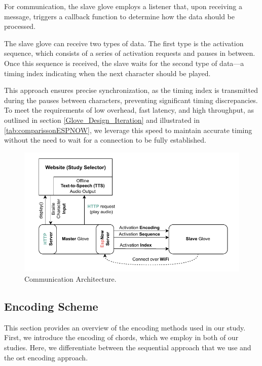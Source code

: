 For communication, the slave glove employs a listener that, upon receiving a message, triggers a callback function to determine how the data should be processed.

The slave glove can receive two types of data. The first type is the activation sequence, which consists of a series of activation requests and pauses in between. Once this sequence is received, the slave waits for the second type of data—a timing index indicating when the next character should be played.

This approach ensures precise synchronization, as the timing index is transmitted during the pauses between characters, preventing significant timing discrepancies. To meet the requirements of low overhead, fast latency, and high throughput, as outlined in section \ref{Glove_Design_Iteration} 
and illustrated in \autoref{tab:comparissonESPNOW}, we leverage this speed to maintain accurate timing without the need to wait for a connection to be fully established.

\begin{figure}
    \centering
    \includegraphics[width=\linewidth]{src/pictures/Wireless_communication.drawio.pdf}
    \caption{Communication Architecture.}
    \label{fig:communicatoin_architecture}
\end{figure}


\subsection{Encoding Scheme}
This section provides an overview of the encoding methods used in our study. First, we introduce the encoding of chords, which we employ in both of our studies. Here, we differentiate between the sequential approach that we use and the \gls{ost} encoding approach.

